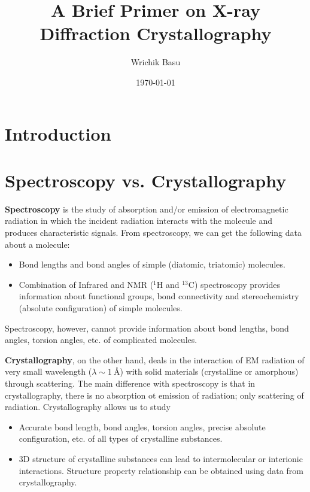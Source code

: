 \documentclass[11pt,a4paper]{article}
\begin{document}
	\title{A Brief Primer on X-ray Diffraction Crystallography}
	\author{Wrichik Basu}
	\date{\today}
	
	\maketitle
	\flushbottom
	
	\section{Introduction}
	
	\section{Spectroscopy vs. Crystallography}
	
		\textbf{Spectroscopy} is the study of absorption and/or emission of electromagnetic radiation in which the incident radiation interacts with the molecule and produces characteristic signals. From spectroscopy, we can get the following data about a molecule: %
%			
			\begin{itemize}%
%		
			    \item Bond lengths and bond angles of simple (diatomic, triatomic) molecules.
			    
			    \item Combination of Infrared and NMR (${}^1 \mathrm{H}$ and ${}^{13} \mathrm{C}$) spectroscopy provides information about functional groups, bond connectivity and stereochemistry (absolute configuration) of simple molecules.
		    
		    \end{itemize}
		    
		Spectroscopy, however, cannot provide information about bond lengths, bond angles, torsion angles, etc. of complicated molecules.
		
		\textbf{Crystallography}, on the other hand, deals in the interaction of EM radiation of very small wavelength ($\lambda \sim \SI{1}{\angstrom}$) with solid materials (crystalline or amorphous) through scattering. The main difference with spectroscopy is that in crystallography, there is no absorption ot emission of radiation; only scattering of radiation. Crystallography allows us to study%
%			
			\begin{itemize}%
%			
			    \item Accurate bond length, bond angles, torsion angles, precise absolute configuration, etc. of all types of crystalline substances.
			    
			    \item 3D structure of crystalline substances can lead to intermolecular or interionic interactions. Structure property relationship can be obtained using data from crystallography.
			    
			\end{itemize}
			
\end{document}
